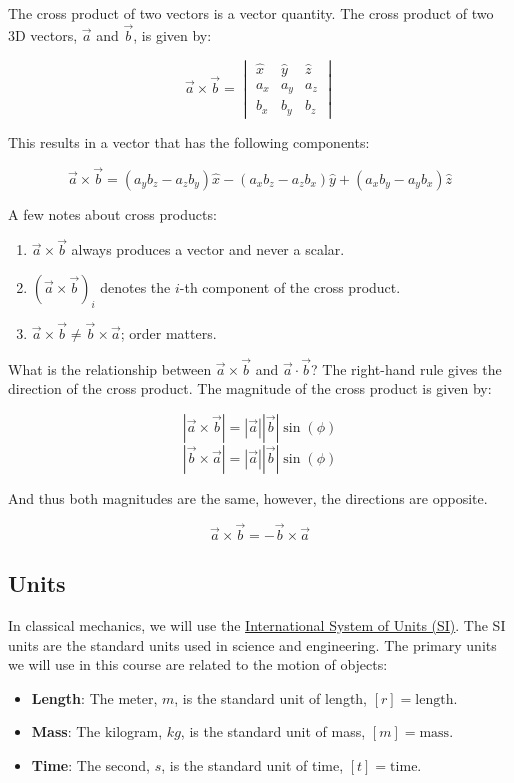 \documentclass[11pt]{article}
\providecommand{\tightlist}{%
      \setlength{\itemsep}{0pt}\setlength{\parskip}{0pt}}
\begin{document}
The cross product of two vectors is a vector quantity. The cross product
of two 3D vectors, \(\vec{a}\) and \(\vec{b}\), is given by:

\[\vec{a} \times \vec{b} = \begin{vmatrix} \hat{x} & \hat{y} & \hat{z} \\ a_x & a_y & a_z \\ b_x & b_y & b_z \end{vmatrix}\]

This results in a vector that has the following components:

\[\vec{a} \times \vec{b} = (a_yb_z - a_zb_y)\hat{x} - (a_xb_z-a_zb_x)\hat{y} + (a_xb_y - a_yb_x)\hat{z}\]

A few notes about cross products:

\begin{enumerate}
\def\labelenumi{\arabic{enumi}.}
\tightlist
\item
  \(\vec{a} \times \vec{b}\) always produces a vector and never a
  scalar.
\item
  \((\vec{a} \times \vec{b})_i\) denotes the \(i\)-th component of the
  cross product.
\item
  \(\vec{a} \times \vec{b} \neq \vec{b} \times \vec{a}\); order matters.
\end{enumerate}

What is the relationship between \(\vec{a} \times \vec{b}\) and
\(\vec{a} \cdot \vec{b}\)? The right-hand rule gives the direction of
the cross product. The magnitude of the cross product is given by:

\[|\vec{a} \times \vec{b}| = |\vec{a}||\vec{b}|\sin(\phi)\]
\[|\vec{b} \times \vec{a}| = |\vec{a}||\vec{b}|\sin(\phi)\]

And thus both magnitudes are the same, however, the directions are
opposite.

\[\vec{a} \times \vec{b} = -\vec{b} \times \vec{a}\]

    \subsection{Units}\label{units}

In classical mechanics, we will use the
\href{https://en.wikipedia.org/wiki/International_System_of_Units}{International
System of Units (SI)}. The SI units are the standard units used in
science and engineering. The primary units we will use in this course
are related to the motion of objects:

\begin{itemize}
\tightlist
\item
  \textbf{Length}: The meter, \(m\), is the standard unit of length,
  \([r] = \mathrm{length}\).
\item
  \textbf{Mass}: The kilogram, \(kg\), is the standard unit of mass,
  \([m] = \mathrm{mass}\).
\item
  \textbf{Time}: The second, \(s\), is the standard unit of time,
  \([t] = \mathrm{time}\).
\end{itemize}
\end{document}
